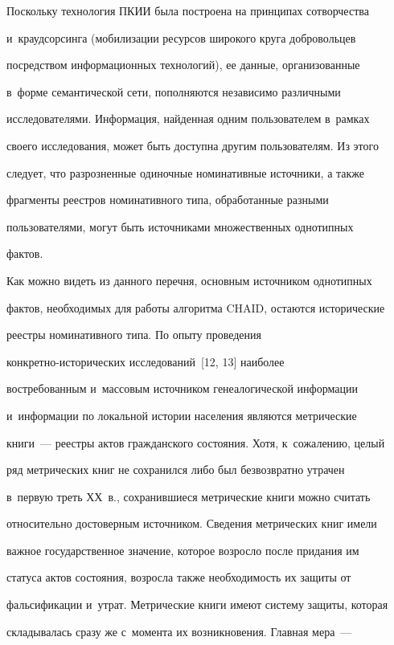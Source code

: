  


  Поскольку технология ПКИИ была построена на принципах сотворчества 


и~краудсорсинга (мобилизации ресурсов широкого круга добровольцев 


посредством информационных технологий), ее данные, организованные 


в~форме семантической сети, пополняются независимо различными 


исследователями. Информация, найденная одним пользователем в~рамках 


своего исследования, может быть доступна другим пользователям. Из этого 


следует, что разрозненные одиночные номинативные источники, а также 


фрагменты реестров номинативного типа, обработанные разными 


пользователями, могут быть источниками множественных однотипных 


фактов.


  


  Как можно видеть из данного перечня, основным источником однотипных 


фактов, необходимых для работы алгоритма CHAID, остаются исторические 


реестры номинативного типа. По опыту проведения  


кон\-крет\-но-ис\-то\-ри\-че\-ских исследований~[12, 13] наиболее 


востребованным и~массовым источником генеалогической информации 


и~информации по локальной истории населения являются метрические  


книги~--- реестры актов гражданского состояния. Хотя, к~сожалению, целый 


ряд метрических книг не сохранился либо был безвозвратно утрачен 


в~первую треть ХХ~в., сохранившиеся метрические книги можно считать 


относительно достоверным источником. Сведения метрических книг имели 


важное государственное значение, которое возросло после придания им 


статуса актов состояния, возросла также необходимость их защиты от 


фальсификации и~утрат. Метрические книги имеют систему защиты, которая 


складывалась сразу же с~момента их возникновения. Главная мера~--- 



